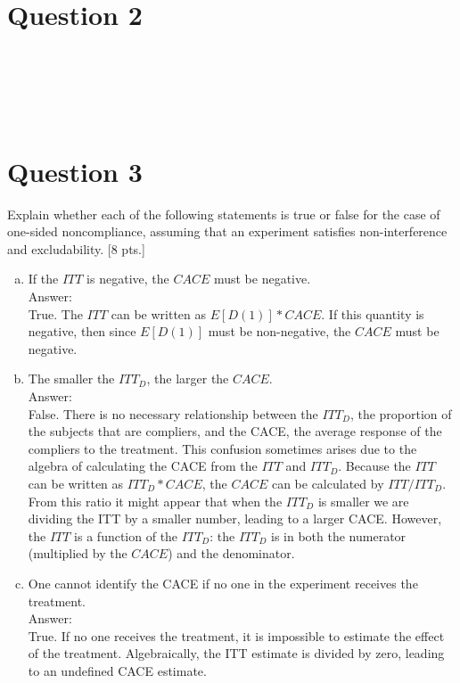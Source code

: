 \documentclass[11pt,notitlepage]{article}\usepackage[]{graphicx}\usepackage[]{color}
\makeatletter
\newenvironment{kframe}{%
 \def\at@end@of@kframe{}%
 \ifinner\ifhmode%
  \def\at@end@of@kframe{\end{minipage}}%
  \begin{minipage}{\columnwidth}%
 \fi\fi%
 \def\FrameCommand##1{\hskip\@totalleftmargin \hskip-\fboxsep
 \colorbox{shadecolor}{##1}\hskip-\fboxsep
     \hskip-\linewidth \hskip-\@totalleftmargin \hskip\columnwidth}%
 \MakeFramed {\advance\hsize-\width
   \@totalleftmargin\z@ \linewidth\hsize
   \@setminipage}}%
 {\par\unskip\endMakeFramed%
 \at@end@of@kframe}
\newenvironment{knitrout}{}{} %
\makeatother
\begin{document}
\section*{Question 2}

\begin{knitrout}
\color{fgcolor}\begin{kframe}
\begin{verbatim}





\end{verbatim}
\end{kframe}
\end{knitrout}



\section*{Question 3}
Explain whether each of the following statements is true or false for the case of one-sided noncompliance, assuming that an experiment satisfies non-interference and excludability. [8 pts.]
\begin{enumerate}[a)]
\item If the $ITT$ is negative, the $CACE$ must be negative.\\
Answer:\\
True. The $ITT$ can be written as $E[D(1)]*CACE$. If this quantity is negative, then since $E[D(1)]$ must be non-negative, the $CACE$ must be negative.  
\item The smaller the $ITT_D$, the larger the $CACE$.\\
Answer:\\
False. There is no necessary relationship between the $ITT_D$, the proportion of the subjects that are compliers, and the CACE, the average response of the compliers to the treatment. This confusion sometimes arises due to the algebra of calculating the CACE from the $ITT$ and $ITT_D$. Because the $ITT$ can be written as $ITT_D*CACE$, the $CACE$ can be calculated by $ITT/ITT_D$. From this ratio it might appear that when the $ITT_D$ is smaller we are dividing the ITT by a smaller number, leading to a larger CACE. However, the $ITT$ is a function of the $ITT_D$: the $ITT_D$ is in both the numerator (multiplied by the $CACE$) and the denominator.
\item One cannot identify the CACE if no one in the experiment receives the treatment.\\
Answer:\\
True. If no one receives the treatment, it is impossible to estimate the effect of the treatment. Algebraically, the ITT estimate is divided by zero, leading to an undefined CACE estimate. 
\end{enumerate}
\end{document}
